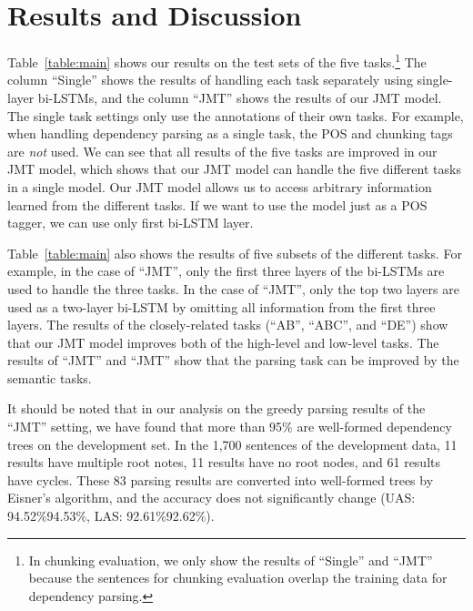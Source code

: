\documentclass[11pt,a4paper]{article}
\begin{document}
\section{Results and Discussion}

Table~\ref{table:main} shows our results on the test sets of the five tasks.\footnote{In chunking evaluation, we only show the results of ``Single'' and ``JMT'' because the sentences for chunking evaluation overlap the training data for dependency parsing.}
The column ``Single'' shows the results of handling each task separately using single-layer bi-LSTMs, and the column ``JMT'' shows the results of our JMT model.
The single task settings only use the annotations of their own tasks.
For example, when handling dependency parsing as a single task, the POS and chunking tags are {\it not} used.
We can see that all results of the five tasks are improved in our JMT model, which shows that our JMT model can handle the five different tasks in a single model.
Our JMT model allows us to access arbitrary information learned from the different tasks.
If we want to use the model just as a POS tagger, we can use only first bi-LSTM layer.

Table~\ref{table:main} also shows the results of five subsets of the different tasks.
For example, in the case of ``JMT'', only the first three layers of the bi-LSTMs are used to handle the three tasks.
In the case of ``JMT'', only the top two layers are used as a two-layer bi-LSTM by omitting all information from the first three layers.
The results of the closely-related tasks (``AB'', ``ABC'', and ``DE'') show that our JMT model improves both of the high-level and low-level tasks.
The results of ``JMT'' and ``JMT'' show that the parsing task can be improved by the semantic tasks.

It should be noted that in our analysis on the greedy parsing results of the ``JMT'' setting, we have found that more than 95\% are well-formed dependency trees on the development set.
In the 1,700 sentences of the development data, 11 results have multiple root notes, 11 results have no root nodes, and 61 results have cycles.
These 83 parsing results are converted into well-formed trees by Eisner's algorithm, and the accuracy does not significantly change (UAS: 94.52\%94.53\%, LAS: 92.61\%92.62\%).
\end{document}
